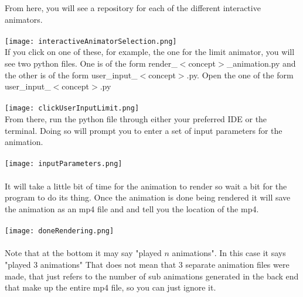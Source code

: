 \documentclass{article}
\begin{document}
From here, you will see a repository for each of the different interactive animators.\\
\\
\texttt{[image: interactiveAnimatorSelection.png]}
\\
If you click on one of these, for example, the one for the limit animator, you will see two python files. One is of the form render\_$<$concept$>$\_animation.py and the other is of the form user\_input\_$<$concept$>$.py. Open the one of the form user\_input\_$<$concept$>$.py\\
\\
\texttt{[image: clickUserInputLimit.png]}
\\
From there, run the python file through either your preferred IDE or the terminal. Doing so will prompt you to enter a set of input parameters for the animation.\\
\\
\texttt{[image: inputParameters.png]}
\\
\\
It will take a little bit of time for the animation to render so wait a bit for the program to do its thing. Once the animation is done being rendered it will save the animation as an mp4 file and and tell you the location of the mp4.\\
\\
\texttt{[image: doneRendering.png]}
\\
\\
Note that at the bottom it may say "played $n$ animations". In this case it says "played 3 animations" That does not mean that 3 separate animation files were made, that just refers to the number of sub animations generated in the back end that make up the entire mp4 file, so you can just ignore it.
\end{document}
